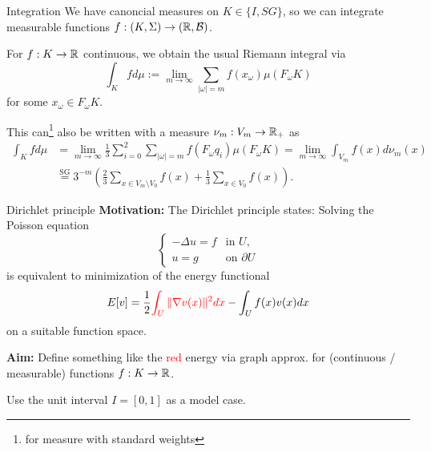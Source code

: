 \begin{frame}{Integration}
    We have canoncial measures on \(K \in \{I, SG \} \), so we can integrate measurable functions \(f: (K, \Sigma) \to (\mathbb{R}, \mathcal{B}) \).
    \begin{lemma}
        For \(f: K \to \mathbb{R} \) continuous, we obtain the usual Riemann integral via
        \[ \int_K f d\mu := \lim_{m \to \infty} \sum_{|\omega | = m} f(x_\omega) \mu(F_\omega K) \]
        for some \(x_\omega \in F_\omega K \).

        This can\footnote{for measure with standard weights} also be written with a measure \(\nu_m: V_m \to \mathbb{R}_+ \) as
        \begin{align*}
            \int_K f d\mu &= \lim_{m \to \infty} \frac{1}{3} \sum_{i=0}^2 \sum_{| \omega | = m} f(F_\omega q_i) \mu(F_\omega K)
            = \lim_{m\to \infty} \int_{V_m} f(x) d\nu_m(x) \\
            &\overset{\text{SG}}= 3^{-m} \left(\frac{2}{3} \sum_{x\in V_m \setminus V_0} f(x) + \frac{1}{3} \sum_{x \in V_0} f(x) \right).
        \end{align*}
    \end{lemma}
\end{frame}

\begin{frame}{Dirichlet principle}
    \textbf{Motivation:} The Dirichlet principle states: Solving the Poisson equation
    \[ \begin{cases}
            -\Delta u = f &\text{in } U,\\
            u = g &\text{on } \partial U
        \end{cases} \]
    is equivalent to minimization of the energy functional
    \[ E[v] = \frac{1}{2} \textcolor{red}{\int_U \| \nabla v(x) \|^2 dx} - \int_U f(x)v(x) dx \]
    on a suitable function space.

    \textbf{Aim:} Define something like the \textcolor{red}{red} energy via graph approx. for (continuous / measurable) functions \(f: K \to \mathbb{R} \).

    Use the unit interval \(I = [0, 1] \) as a model case.
\end{frame}

